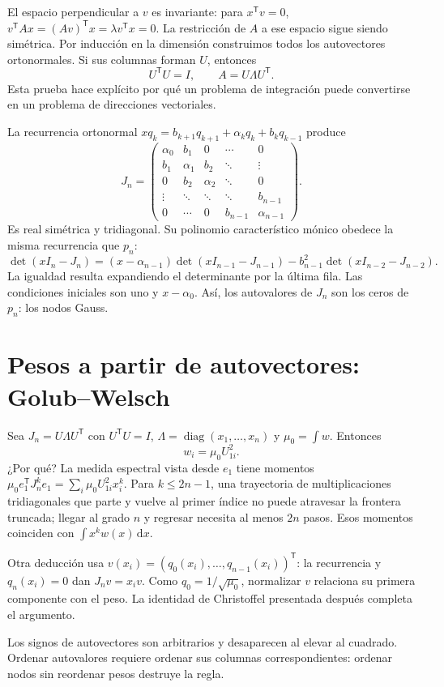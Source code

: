 \documentclass[11pt,a4paper]{article}
\newcommand{\dd}{\,\mathrm d}
\newcommand{\T}{^{\mathsf T}}
\DeclareMathOperator{\diag}{diag}
\theoremstyle{definition}
\newcounter{problema}
\begin{document}
El espacio perpendicular a $v$ es invariante: para $x^{\mathsf T}v=0$,
$v^{\mathsf T}Ax=(Av)^{\mathsf T}x=\lambda v^{\mathsf T}x=0$.
La restricción de $A$ a ese espacio sigue siendo simétrica. Por inducción en la dimensión construimos todos los autovectores ortonormales. Si sus columnas forman $U$, entonces
\[
U^{\mathsf T}U=I,\qquad A=U\Lambda U^{\mathsf T}.
\]
Esta prueba hace explícito por qué un problema de integración puede convertirse en un problema de direcciones vectoriales.

La recurrencia ortonormal
$xq_k=b_{k+1}q_{k+1}+\alpha_kq_k+b_kq_{k-1}$
produce
\[
J_n=\begin{pmatrix}
\alpha_0&b_1&0&\cdots&0\\
b_1&\alpha_1&b_2&\ddots&\vdots\\
0&b_2&\alpha_2&\ddots&0\\
\vdots&\ddots&\ddots&\ddots&b_{n-1}\\
0&\cdots&0&b_{n-1}&\alpha_{n-1}
\end{pmatrix}.
\]
Es real simétrica y tridiagonal. Su polinomio característico mónico obedece la misma recurrencia que $p_n$:
\[
\det(xI_n-J_n)=(x-\alpha_{n-1})\det(xI_{n-1}-J_{n-1})
-b_{n-1}^2\det(xI_{n-2}-J_{n-2}).
\]
La igualdad resulta expandiendo el determinante por la última fila. Las condiciones iniciales son uno y $x-\alpha_0$. Así, los autovalores de $J_n$ son los ceros de $p_n$: los nodos Gauss.

\section{Pesos a partir de autovectores: Golub--Welsch}
Sea $J_n=U\Lambda U\T$ con $U\T U=I$, $\Lambda=\diag(x_1,\ldots,x_n)$ y $\mu_0=\int w$. Entonces
\[
w_i=\mu_0 U_{1i}^2.
\]
¿Por qué? La medida espectral vista desde $e_1$ tiene momentos
$\mu_0e_1\T J_n^k e_1=\sum_i\mu_0U_{1i}^2x_i^k$. Para $k\le2n-1$, una trayectoria de multiplicaciones tridiagonales que parte y vuelve al primer índice no puede atravesar la frontera truncada; llegar al grado $n$ y regresar necesita al menos $2n$ pasos. Esos momentos coinciden con $\int x^kw(x)\dd x$.

Otra deducción usa $v(x_i)=(q_0(x_i),\ldots,q_{n-1}(x_i))\T$:
la recurrencia y $q_n(x_i)=0$ dan $J_nv=x_iv$. Como $q_0=1/\sqrt{\mu_0}$, normalizar $v$ relaciona su primera componente con el peso. La identidad de Christoffel presentada después completa el argumento.

Los signos de autovectores son arbitrarios y desaparecen al elevar al cuadrado. Ordenar autovalores requiere ordenar sus columnas correspondientes: ordenar nodos sin reordenar pesos destruye la regla.
\end{document}
